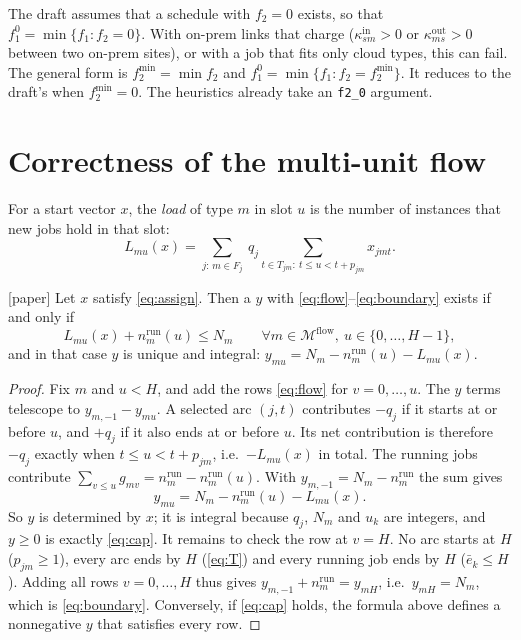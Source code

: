 \documentclass[11pt,a4paper]{article}
\newcommand{\M}{\mathcal{M}}
\newcommand{\code}[1]{\texttt{#1}}
\newcommand{\pin}{\mathrm{in}}
\newcommand{\pout}{\mathrm{out}}
\newcommand{\run}{\mathrm{run}}
\newcommand{\status}[1]{\textsf{\small[#1]}}
\begin{document}
\begin{remark}\label{rem:f20}
The draft assumes that a schedule with $f_2=0$ exists, so that
$f_1^0=\min\{f_1:f_2=0\}$. With on-prem links that charge
($\kappa^\pin_{sm}>0$ or $\kappa^\pout_{ms}>0$ between two on-prem sites), or
with a job that fits only cloud types, this can fail. The general form is
$f_2^{\min}=\min f_2$ and $f_1^0=\min\{f_1:f_2=f_2^{\min}\}$. It reduces to the
draft's when $f_2^{\min}=0$. The heuristics already take an \code{f2\_0}
argument.
\end{remark}

\section{Correctness of the multi-unit flow}\label{sec:correct}

For a start vector $x$, the \emph{load} of type $m$ in slot $u$ is the number
of instances that new jobs hold in that slot:
\[
  L_{mu}(x)=\sum_{j:\,m\in F_j}\ q_j\!\!\sum_{t\in T_{jm}:\ t\le u<t+p_{jm}}\!\! x_{jmt}.
\]

\begin{proposition}\label{prop:capacity}
\status{paper} Let $x$ satisfy \eqref{eq:assign}. Then a $y$ with
\eqref{eq:flow}--\eqref{eq:boundary} exists if and only if
\begin{equation}\label{eq:cap}
  L_{mu}(x)+n^\run_m(u)\le N_m\qquad\forall m\in\M^{\mathrm{flow}},\ u\in\{0,\dots,H-1\},
\end{equation}
and in that case $y$ is unique and integral:
$y_{mu}=N_m-n^\run_m(u)-L_{mu}(x)$.
\end{proposition}

\begin{proof}
Fix $m$ and $u<H$, and add the rows \eqref{eq:flow} for $v=0,\dots,u$. The $y$
terms telescope to $y_{m,-1}-y_{mu}$. A selected arc $(j,t)$ contributes
$-q_j$ if it starts at or before $u$, and $+q_j$ if it also ends at or before
$u$. Its net contribution is therefore $-q_j$ exactly when $t\le u<t+p_{jm}$,
i.e.\ $-L_{mu}(x)$ in total. The running jobs contribute
$\sum_{v\le u}g_{mv}=n^\run_m-n^\run_m(u)$. With
$y_{m,-1}=N_m-n^\run_m$ the sum gives
\[
  y_{mu}=N_m-n^\run_m(u)-L_{mu}(x).
\]
So $y$ is determined by $x$; it is integral because $q_j$, $N_m$ and $u_k$
are integers, and $y\ge0$ is exactly \eqref{eq:cap}. It remains to check the
row at $v=H$. No arc starts at $H$ ($p_{jm}\ge1$), every arc ends by $H$
(\eqref{eq:T}) and every running job ends by $H$ ($\bar e_k\le H$). Adding all
rows $v=0,\dots,H$ thus gives $y_{m,-1}+n^\run_m=y_{mH}$, i.e.\
$y_{mH}=N_m$, which is \eqref{eq:boundary}. Conversely, if \eqref{eq:cap}
holds, the formula above defines a nonnegative $y$ that satisfies every row.
\end{proof}
\end{document}
